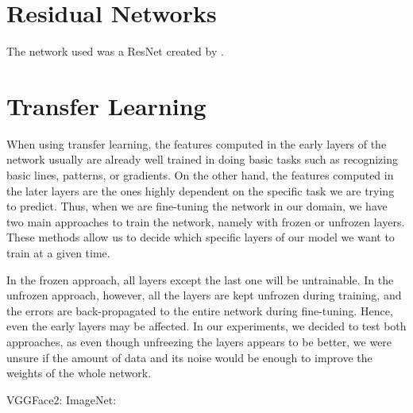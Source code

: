 \section{Residual Networks}

The network used was a ResNet created by \cite{ParkhiVZ15}.

\section{Transfer Learning}

When using transfer learning, the features computed in the early layers of the network usually are already well trained in doing basic tasks such as recognizing basic lines, patterns, or gradients. On the other hand, the features computed in the later layers are the ones highly dependent on the specific task we are trying to predict. Thus, when we are fine-tuning the network in our domain, we have two main approaches to train the network, namely with frozen or unfrozen layers. These methods allow us to decide which specific layers of our model we want to train at a given time. 

In the frozen approach, all layers except the last one will be untrainable. In the unfrozen approach, however, all the layers are kept unfrozen during training, and the errors are back-propagated to the entire network during fine-tuning. Hence, even the early layers may be affected. In our experiments, we decided to test both approaches, as even though unfreezing the layers appears to be better, we were unsure if the amount of data and its noise would be enough to improve the weights of the whole network.

VGGFace2: \citep{Cao2018}
ImageNet: \citep{DengDSLL009}


